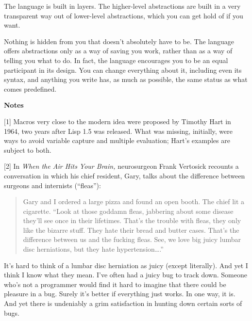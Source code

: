 The language is built in layers. The higher-level abstractions are built
in a very transparent way out of lower-level abstractions, which you can
get hold of if you want.

Nothing is hidden from you that doesn't absolutely have to be. The
language offers abstractions only as a way of saving you work, rather
than as a way of telling you what to do. In fact, the language
encourages you to be an equal participant in its design. You can change
everything about it, including even its syntax, and anything you write
has, as much as possible, the same status as what comes predefined.

\textbf{Notes}

{[}1{]} Macros very close to the modern idea were proposed by Timothy
Hart in 1964, two years after Lisp 1.5 was released. What was missing,
initially, were ways to avoid variable capture and multiple evaluation;
Hart's examples are subject to both.

{[}2{]} In \emph{When the Air Hits Your Brain,} neurosurgeon Frank
Vertosick recounts a conversation in which his chief resident, Gary,
talks about the difference between surgeons and internists (``fleas''):

\begin{quote}
Gary and I ordered a large pizza and found an open booth. The chief lit
a cigarette. ``Look at those goddamn fleas, jabbering about some disease
they'll see once in their lifetimes. That's the trouble with fleas, they
only like the bizarre stuff. They hate their bread and butter cases.
That's the difference between us and the fucking fleas. See, we love big
juicy lumbar disc herniations, but they hate hypertension\ldots.''
\end{quote}

It's hard to think of a lumbar disc herniation as juicy (except
literally). And yet I think I know what they mean. I've often had a
juicy bug to track down. Someone who's not a programmer would find it
hard to imagine that there could be pleasure in a bug. Surely it's
better if everything just works. In one way, it is. And yet there is
undeniably a grim satisfaction in hunting down certain sorts of bugs.
